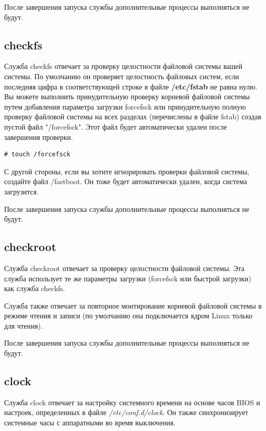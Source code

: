 \documentclass[10pt]{book}
\begin{document}
После завершения запуска службы дополнительные процессы выполняться не будут.

\subsection{checkfs}
Служба checkfs отвечает за проверку целостности файловой системы вашей системы. По умолчанию он проверяет целостность файловых систем, если последняя цифра в соответствующей строке в файле \textbf{/etc/fstab} не равна нулю. Вы можете выполнить принудительную проверку корневой файловой системы путем добавления параметра загрузки forcefsck или принудительную полную проверку файловой системы на всех разделах (перечислены в файле fstab) создав пустой файл "/forcefsck". Этот файл будет автоматически удален после завершения проверки.

\begin{tcolorbox} 
\begin{lstlisting}
# touch /forcefsck
\end{lstlisting}
\end{tcolorbox}

С другой стороны, если вы хотите игнорировать проверки файловой системы, создайте файл /fastboot. Он тоже будет автоматически удален, когда система загрузится.

После завершения запуска службы дополнительные процессы выполняться не будут.

\subsection{checkroot}
Служба checkroot отвечает за проверку целостности файловой системы. Эта служба использует те же параметры загрузки (forcefsck или быстрой загрузки) как служба checkfs.

Служба также отвечает за повторное монтирование корневой файловой системы в режиме чтения и записи (по умолчанию она подключается ядром Linux только для чтения).

После завершения запуска службы дополнительные процессы выполняться не будут.

\subsection{clock}

Служба clock отвечает за настройку системного времени на основе часов BIOS и настроек, определенных в файле \textit{/etc/conf.d/clock}. Он также синхронизирует системные часы с аппаратными во время выключения.
\end{document}

